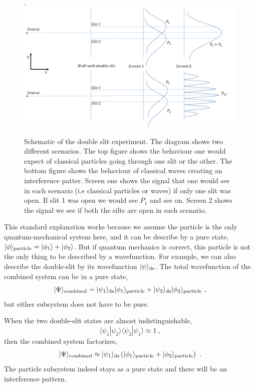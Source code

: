 \documentclass[aps,showpacs,twocolumn,floats,prd,superscriptaddress,nofootinbib]{revtex4-1}
\begin{document}
\begin{figure}[h!]
\begin{center}.
\includegraphics[scale = 0.5]{DSe.pdf}
\caption{Schematic of the double slit experiment. The diagram shows two different scenarios. The top figure shows the behaviour one would expect of classical particles going through one slit or the other. The bottom figure shows the behaviour of classical waves creating an interference patter. Screen one shows the signal that one would see in each scenario (i.e classical particles or waves) if only one slit was open. If slit 1 was open we would see $P_1$ and see on. Screen 2 shows the signal we see if both the silts are open in each scenario.}
\label{fig-doubleslit}
\end{center}
\end{figure}

This standard explanation works because we assume the particle is the only quantum-mechanical system here, and it can be describe by a pure state, $|\phi\rangle_{\rm particle} = |\phi_1\rangle + |\phi_2\rangle$.
But if quantum mechanics is correct, this particle is not the only thing to be described by a wavefunction. 
For example, we can also describe the double-slit by its wavefunction $|\psi\rangle_{\rm ds}$. The total wavefunction of the combined system can be in a pure state,
\begin{equation}
|\Psi\rangle_{\rm combined} = |\psi_1\rangle_{\rm ds}|\phi_1\rangle_{\rm particle} 
+ |\psi_2\rangle_{\rm ds}|\phi_2\rangle_{\rm particle} ~,
\end{equation}
but either subsystem does not have to be pure.

When the two double-slit states are almost indistinguishable,
\begin{equation}
\langle\psi_1|\psi_2\rangle\langle\psi_2|\psi_1\rangle \approx 1~,
\label{eq-pure}
\end{equation}
then the combined system factorizes,
\begin{equation}
|\Psi\rangle_{\rm combined} \approx |\psi_1\rangle_{\rm ds}
\left(|\phi_1\rangle_{\rm particle} + |\phi_2\rangle_{\rm particle}\right) ~.
\end{equation}
The particle subsystem indeed stays as a pure state and there will be an interference pattern.
\end{document}
